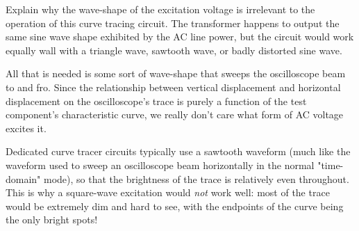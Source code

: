 

Explain why the wave-shape of the excitation voltage is irrelevant to the operation of this curve tracing circuit.  The transformer happens to output the same sine wave shape exhibited by the AC line power, but the circuit would work equally wall with a triangle wave, sawtooth wave, or badly distorted sine wave.







All that is needed is some sort of wave-shape that sweeps the oscilloscope beam to and fro.  Since the relationship between vertical displacement and horizontal displacement on the oscilloscope's trace is purely a function of the test component's characteristic curve, we really don't care what form of AC voltage excites it.







Dedicated curve tracer circuits typically use a sawtooth waveform (much like the waveform used to sweep an oscilloscope beam horizontally in the normal "time-domain" mode), so that the brightness of the trace is relatively even throughout.  This is why a square-wave excitation would {\it not} work well: most of the trace would be extremely dim and hard to see, with the endpoints of the curve being the only bright spots!



